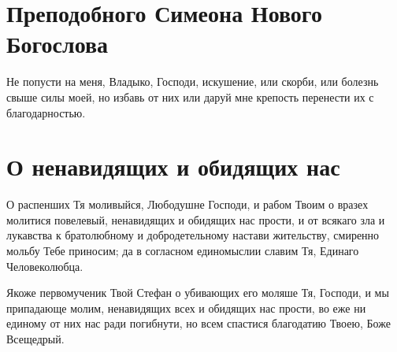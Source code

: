\label{_content_molitvi-vskorbyah}

 


\ifpdf
  {\centering{}\par}
\else
  \section{Преподобного Симеона Нового Богослова}
\fi

\begin{mymulticols}

Не попусти на меня, Владыко, Господи, искушение, или скорби, или болезнь свыше силы моей, но избавь от них или даруй мне крепость перенести их с благодарностью.

\end{mymulticols}

\section{О ненавидящих и обидящих нас}\begin{mymulticols}
 
\ifpdf
\else
\fi

О распенших Тя моливыйся, Любодушне Господи, и рабом Твоим о вразех молитися повелевый, ненавидящих и обидящих нас прости, и от всякаго зла и лукавства к братолюбному и добродетельному настави жительству, смиренно мольбу Тебе приносим; да в согласном единомыслии славим Тя, Единаго Человеколюбца.

\ifpdf
\else
\fi

Якоже первомученик Твой Стефан о убивающих его моляше Тя, Господи, и мы припадающе молим, ненавидящих всех и обидящих нас прости, во еже ни единому от них нас ради погибнути, но всем спастися благодатию Твоею, Боже Всещедрый.

\end{mymulticols}

